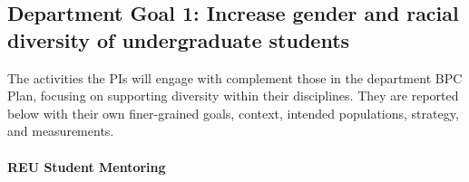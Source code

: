 \setcounter{footnote}{0}

\subsection*{Department Goal 1: Increase gender and racial diversity of undergraduate
students}

The activities the PIs will engage with complement those in the department BPC
Plan, focusing on supporting diversity within their disciplines. They are
reported below with their own finer-grained goals, context, intended
populations, strategy, and measurements.

\paragraph*{REU Student Mentoring}

